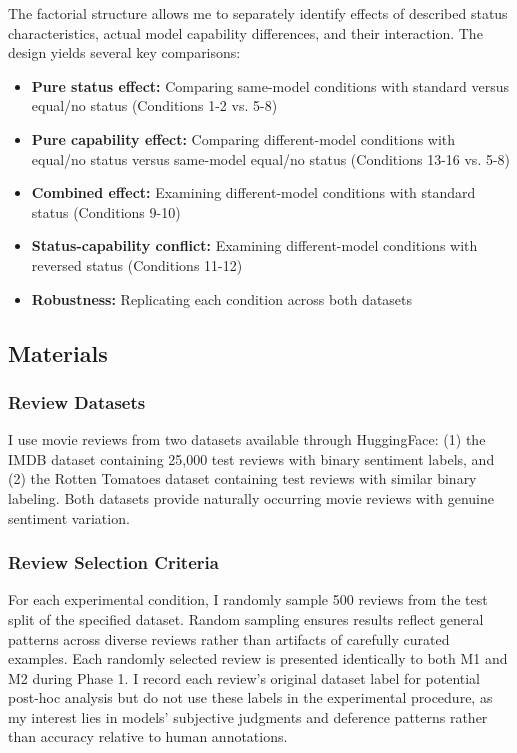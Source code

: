 The factorial structure allows me to separately identify effects of described status characteristics, actual model capability differences, and their interaction. The design yields several key comparisons:

\begin{itemize}
\item \textbf{Pure status effect:} Comparing same-model conditions with standard versus equal/no status (Conditions 1-2 vs. 5-8)
\item \textbf{Pure capability effect:} Comparing different-model conditions with equal/no status versus same-model equal/no status (Conditions 13-16 vs. 5-8)
\item \textbf{Combined effect:} Examining different-model conditions with standard status (Conditions 9-10)
\item \textbf{Status-capability conflict:} Examining different-model conditions with reversed status (Conditions 11-12)
\item \textbf{Robustness:} Replicating each condition across both datasets
\end{itemize}

\subsection*{Materials}

\subsubsection*{Review Datasets}

I use movie reviews from two datasets available through HuggingFace: (1) the IMDB dataset \citep{maas2011learning} containing 25,000 test reviews with binary sentiment labels, and (2) the Rotten Tomatoes dataset \citep{pang2005seeing} containing test reviews with similar binary labeling. Both datasets provide naturally occurring movie reviews with genuine sentiment variation.

\subsubsection*{Review Selection Criteria}

For each experimental condition, I randomly sample 500 reviews from the test split of the specified dataset. Random sampling ensures results reflect general patterns across diverse reviews rather than artifacts of carefully curated examples. Each randomly selected review is presented identically to both M1 and M2 during Phase 1. I record each review's original dataset label for potential post-hoc analysis but do not use these labels in the experimental procedure, as my interest lies in models' subjective judgments and deference patterns rather than accuracy relative to human annotations.

